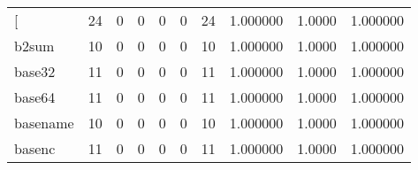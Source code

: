 \begin{longtable}{lrrrrrrrrr}
\bottomrule
\endlastfoot
{[}         &                                       24 &                                                  0 &                                                  0 &                                                  0 &                                                  0 &                                                 24 &                                           1.000000 &                                 1.0000 &                             1.000000 \\
b2sum     &                                       10 &                                                  0 &                                                  0 &                                                  0 &                                                  0 &                                                 10 &                                           1.000000 &                                 1.0000 &                             1.000000 \\
base32    &                                       11 &                                                  0 &                                                  0 &                                                  0 &                                                  0 &                                                 11 &                                           1.000000 &                                 1.0000 &                             1.000000 \\
base64    &                                       11 &                                                  0 &                                                  0 &                                                  0 &                                                  0 &                                                 11 &                                           1.000000 &                                 1.0000 &                             1.000000 \\
basename  &                                       10 &                                                  0 &                                                  0 &                                                  0 &                                                  0 &                                                 10 &                                           1.000000 &                                 1.0000 &                             1.000000 \\
basenc    &                                       11 &                                                  0 &                                                  0 &                                                  0 &                                                  0 &                                                 11 &                                           1.000000 &                                 1.0000 &                             1.000000 \\

\end{longtable}
